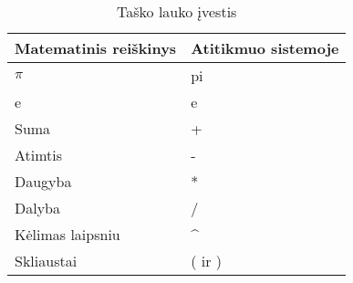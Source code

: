 	
	\begin{table} [H]
		\renewcommand{\tabularxcolumn}[1]{m{#1}}
		\centering
		\caption{Taško lauko įvestis}
		\label{tab:pointInput}
		\begin{tabular} {| l | l |}
			\hline
			Matematinis reiškinys					& Atitikmuo sistemoje 			\\
			\hline		
			$\pi$									& pi							\\
			\hline	
			e 										& e								\\
			\hline	
			Suma 									& +								\\
			\hline					
			Atimtis 								& -								\\
			\hline
			Daugyba									& *								\\
			\hline
			Dalyba 									& 	/							\\
			\hline
			Kėlimas laipsniu 						& \string^	 							\\
			\hline
			Skliaustai 								& ( ir )						\\
			\hline
		\end{tabular}
	\end{table}
	
	
	